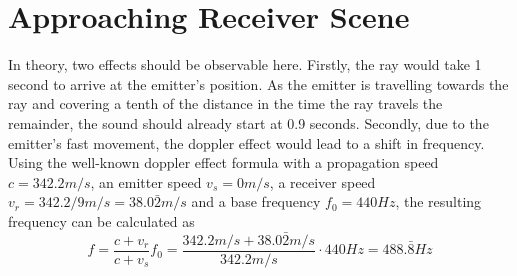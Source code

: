 \section{Approaching Receiver Scene}

In theory, two effects should be observable here.
\newline
Firstly, the ray would take 1 second to arrive at the emitter's position.
As the emitter is travelling towards the ray and covering a tenth of the distance in the time the ray travels the remainder,
the sound should already start at 0.9 seconds.
\newline
Secondly, due to the emitter's fast movement,
the doppler effect would lead to a shift in frequency.
\newline
Using the well-known doppler effect formula with a propagation speed \(c = 342.2 m/s\), an emitter speed \(v_s = 0 m/s\),
a receiver speed \(v_r = 342.2/9 m/s = 38.0\bar{2} m/s\) and a base frequency \(f_0 = 440 Hz\),
the resulting frequency can be calculated as
\begin{equation}\label{eq:Doppler}
    f = \frac{c + v_r}{c + v_s} f_0 = \frac{342.2 m/s + 38.0\bar{2} m/s}{342.2 m/s} \cdot 440Hz = 488.\bar{8} Hz
\end{equation}

